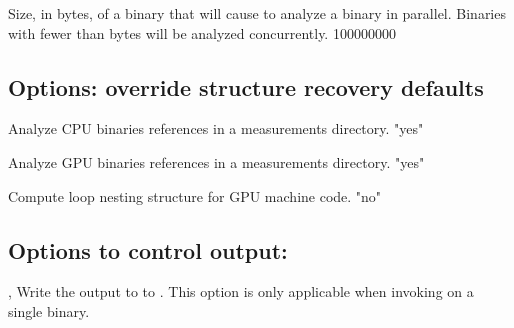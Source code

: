 \documentclass[english]{article}
\begin{document}
\item[\OptArg{--psize}{n}]
Size, in bytes, of a binary that will cause 
to analyze a binary in parallel.
Binaries with fewer than  bytes will be analyzed
concurrently. {100000000}

\subsection{Options: override structure recovery defaults}

\begin{Description}

\item[\OptArg{--cpu}{"yes"/"no"}]
Analyze CPU binaries references in a measurements directory. {"yes"}

\item[\OptArg{--gpu}{"yes"/"no"}]
Analyze GPU binaries references in a measurements directory. {"yes"}

\item[\OptArg{--gpucfg}{"yes"/"no"}]
Compute loop nesting structure for GPU machine code. {"no"}


% 

\end{Description}

\subsection{Options to control output:}
\begin{Description}

\item[\OptArg{-o}{filename}, \OptArg{--output}{filename}]
Write the output to to .  This option is only applicable when invoking
 on a single binary.

\end{Description}
\end{document}
